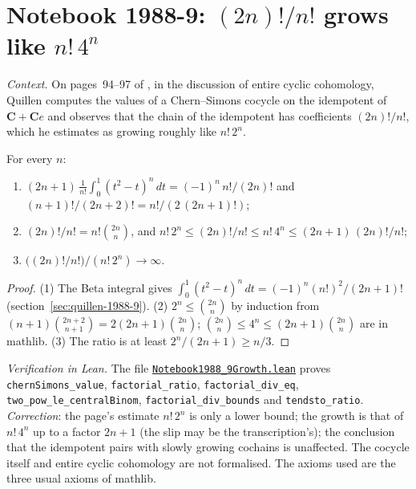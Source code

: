 \section[Notebook 1988-9: the Chern--Simons values of an idempotent]{Notebook 1988-9: $(2n)!/n!$ grows like $n!\,4^n$\protect{}}\label{sec:quillen-1988-9-growth}

\emph{Context.} On pages~94--97 of , in the discussion of entire cyclic cohomology, Quillen computes the values of a Chern--Simons cocycle on the idempotent of $\mathbf C + \mathbf Ce$ and observes that the chain of the idempotent has coefficients $(2n)!/n!$, which he estimates as growing roughly like $n!\,2^n$.

\begin{encadre}
\begin{theoreme}\label{thm:quillen-1988-9-growth}
For every $n$:
\begin{enumerate}
\item $(2n + 1)\,\frac{1}{n!}\int_0^1(t^2 - t)^n\,dt = (-1)^n\,n!/(2n)!$ and $(n + 1)!/(2n + 2)! = n!/(2\,(2n + 1)!)$;
\item $(2n)!/n! = n!\binom{2n}{n}$, and $n!\,2^n \le (2n)!/n! \le n!\,4^n \le (2n + 1)\,(2n)!/n!$;
\item $\bigl((2n)!/n!\bigr)/(n!\,2^n) \to \infty$.
\end{enumerate}
\end{theoreme}
\end{encadre}

\begin{proof}
(1) The Beta integral gives $\int_0^1(t^2 - t)^n\,dt = (-1)^n(n!)^2/(2n + 1)!$ (section~\ref{sec:quillen-1988-9}). (2) $2^n \le \binom{2n}{n}$ by induction from $(n + 1)\binom{2n+2}{n+1} = 2(2n + 1)\binom{2n}{n}$; $\binom{2n}{n} \le 4^n \le (2n + 1)\binom{2n}{n}$ are in mathlib. (3) The ratio is at least $2^n/(2n + 1) \ge n/3$.
\end{proof}

\emph{Verification in Lean.} The file \href{\leanblobmain/Notebook1988_9Growth.lean}{\texttt{Notebook1988\_9Growth.\allowbreak{}lean}} proves \texttt{chernSimons\_value}, \texttt{factorial\_ratio}, \texttt{factorial\_div\_eq}, \texttt{two\_pow\_le\_centralBinom}, \texttt{factorial\_div\_bounds} and \texttt{tendsto\_ratio}. \emph{Correction}: the page's estimate $n!\,2^n$ is only a lower bound; the growth is that of $n!\,4^n$ up to a factor $2n + 1$ (the slip may be the transcription's); the conclusion that the idempotent pairs with slowly growing cochains is unaffected. The cocycle itself and entire cyclic cohomology are not formalised. The axioms used are the three usual axioms of mathlib.

